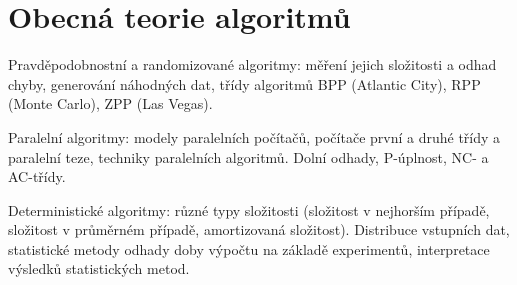 \newpage
\section{Obecná teorie algoritmů}
\begin{pozadavky}
\begin{pitemize}
\item Pravděpodobnostní a randomizované algoritmy: měření jejich složitosti a odhad chyby, generování náhodných dat, třídy algoritmů BPP (Atlantic City), RPP (Monte Carlo), ZPP (Las Vegas).
\item Paralelní algoritmy: modely paralelních počítačů, počítače první a druhé třídy a paralelní teze, techniky paralelních algoritmů. Dolní odhady, P-úplnost, NC- a AC-třídy.
\item Deterministické algoritmy: různé typy složitosti (složitost v nejhorším případě, složitost v průměrném případě, amortizovaná složitost). Distribuce vstupních dat, statistické metody odhady doby výpočtu na základě experimentů, interpretace výsledků statistických metod.
\end{pitemize}
\end{pozadavky}


